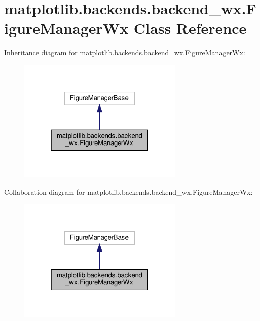 \hypertarget{classmatplotlib_1_1backends_1_1backend__wx_1_1FigureManagerWx}{}\section{matplotlib.\+backends.\+backend\+\_\+wx.\+Figure\+Manager\+Wx Class Reference}
\label{classmatplotlib_1_1backends_1_1backend__wx_1_1FigureManagerWx}


Inheritance diagram for matplotlib.\+backends.\+backend\+\_\+wx.\+Figure\+Manager\+Wx\+:
\nopagebreak
\begin{figure}[H]
\begin{center}
\leavevmode
\includegraphics[width=223pt]{classmatplotlib_1_1backends_1_1backend__wx_1_1FigureManagerWx__inherit__graph}
\end{center}
\end{figure}


Collaboration diagram for matplotlib.\+backends.\+backend\+\_\+wx.\+Figure\+Manager\+Wx\+:
\nopagebreak
\begin{figure}[H]
\begin{center}
\leavevmode
\includegraphics[width=223pt]{classmatplotlib_1_1backends_1_1backend__wx_1_1FigureManagerWx__coll__graph}
\end{center}
\end{figure}
